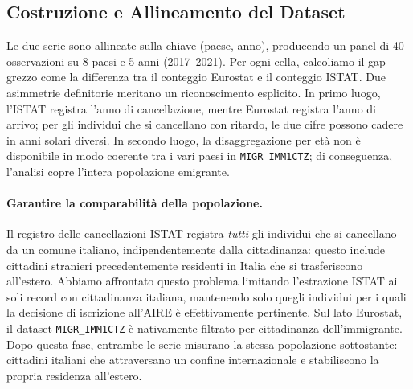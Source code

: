 \subsection{Costruzione e Allineamento del Dataset}
\label{subsec:data_alignment}

Le due serie sono allineate sulla chiave (paese, anno), producendo un panel di 40 osservazioni su 8 paesi e 5 anni (2017--2021).
Per ogni cella, calcoliamo il gap grezzo come la differenza tra il conteggio Eurostat e il conteggio ISTAT.
Due asimmetrie definitorie meritano un riconoscimento esplicito.
In primo luogo, l'ISTAT registra l'anno di cancellazione, mentre Eurostat registra l'anno di arrivo; per gli individui che si cancellano con ritardo, le due cifre possono cadere in anni solari diversi.
In secondo luogo, la disaggregazione per età non è disponibile in modo coerente tra i vari paesi in \texttt{MIGR\_IMM1CTZ}; di conseguenza, l'analisi copre l'intera popolazione emigrante.
\paragraph{Garantire la comparabilità della popolazione.}
Il registro delle cancellazioni ISTAT registra \emph{tutti} gli individui che si cancellano da un comune italiano, indipendentemente dalla cittadinanza: questo include cittadini stranieri precedentemente residenti in Italia che si trasferiscono all'estero.
Abbiamo affrontato questo problema limitando l'estrazione ISTAT ai soli record con cittadinanza italiana, mantenendo solo quegli individui per i quali la decisione di iscrizione all'AIRE è effettivamente pertinente.
Sul lato Eurostat, il dataset \texttt{MIGR\_IMM1CTZ} è nativamente filtrato per cittadinanza dell'immigrante.
Dopo questa fase, entrambe le serie misurano la stessa popolazione sottostante: cittadini italiani che attraversano un confine internazionale e stabiliscono la propria residenza all'estero.
